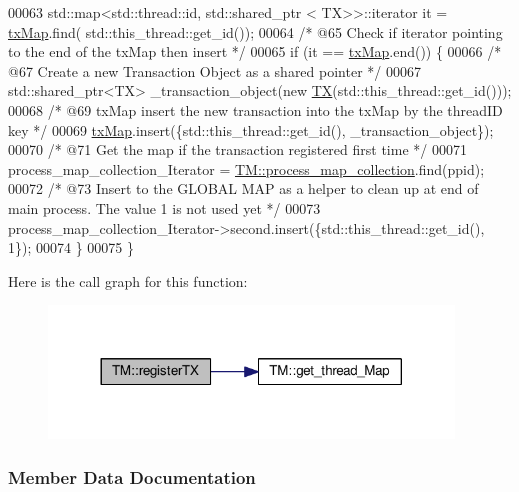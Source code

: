 \begin{DoxyCode}
00063     std::map<std::thread::id, std::shared\_ptr < TX>>::iterator it = \hyperlink{class_t_m_a0333dfa193ea99d7626de74a2b932e9b_a0333dfa193ea99d7626de74a2b932e9b}{txMap}.find(
      std::this\_thread::get\_id());
00064     \textcolor{comment}{/* @65 Check if iterator pointing to the end of the txMap then insert */}
00065     \textcolor{keywordflow}{if} (it == \hyperlink{class_t_m_a0333dfa193ea99d7626de74a2b932e9b_a0333dfa193ea99d7626de74a2b932e9b}{txMap}.end()) \{
00066         \textcolor{comment}{/* @67 Create a new Transaction Object as a shared pointer */}
00067         std::shared\_ptr<TX> \_transaction\_object(\textcolor{keyword}{new} \hyperlink{class_t_x}{TX}(std::this\_thread::get\_id()));
00068         \textcolor{comment}{/* @69 txMap insert the new transaction into the txMap by the threadID key */}
00069         \hyperlink{class_t_m_a0333dfa193ea99d7626de74a2b932e9b_a0333dfa193ea99d7626de74a2b932e9b}{txMap}.insert(\{std::this\_thread::get\_id(), \_transaction\_object\});
00070         \textcolor{comment}{/* @71 Get the map if the transaction registered first time */}
00071         process\_map\_collection\_Iterator = \hyperlink{class_t_m_a6d417b18213968da2a70a914e80d639b_a6d417b18213968da2a70a914e80d639b}{TM::process\_map\_collection}.find(ppid);
00072         \textcolor{comment}{/* @73 Insert to the GLOBAL MAP as a helper to clean up at end of main process. The value 1 is not
       used yet */}
00073         process\_map\_collection\_Iterator->second.insert(\{std::this\_thread::get\_id(), 1\});
00074     \}
00075 \}
\end{DoxyCode}


Here is the call graph for this function\+:\nopagebreak
\begin{figure}[H]
\begin{center}
\leavevmode
\includegraphics[width=305pt]{class_t_m_a26ea481c24d9aa3aebd6dafb7253376e_a26ea481c24d9aa3aebd6dafb7253376e_cgraph}
\end{center}
\end{figure}




\subsubsection{Member Data Documentation}
